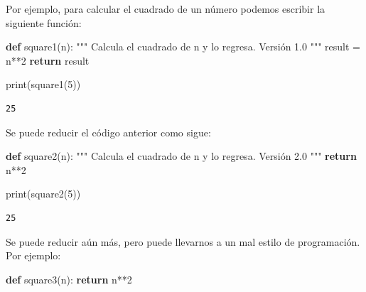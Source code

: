\documentclass[
  spanish,
  letterpaper,
]{scrbook}
\newenvironment{Shaded}{\begin{snugshade}}{\end{snugshade}}
\newcommand{\BuiltInTok}[1]{\textcolor[rgb]{0.00,0.23,0.31}{#1}}
\newcommand{\CommentTok}[1]{\textcolor[rgb]{0.37,0.37,0.37}{#1}}
\newcommand{\ControlFlowTok}[1]{\textcolor[rgb]{0.00,0.23,0.31}{\textbf{#1}}}
\newcommand{\DecValTok}[1]{\textcolor[rgb]{0.68,0.00,0.00}{#1}}
\newcommand{\KeywordTok}[1]{\textcolor[rgb]{0.00,0.23,0.31}{\textbf{#1}}}
\newcommand{\NormalTok}[1]{\textcolor[rgb]{0.00,0.23,0.31}{#1}}
\newcommand{\OperatorTok}[1]{\textcolor[rgb]{0.37,0.37,0.37}{#1}}
\theoremstyle{definition}
\theoremstyle{remark}
\begin{document}
Por ejemplo, para calcular el cuadrado de un número podemos escribir la
siguiente función:

\begin{Shaded}
\begin{Highlighting}[]
\KeywordTok{def}\NormalTok{ square1(n):}
    \CommentTok{"""}
\CommentTok{    Calcula el cuadrado de n y lo regresa. Versión 1.0}
\CommentTok{    """}
\NormalTok{    result }\OperatorTok{=}\NormalTok{ n}\OperatorTok{**}\DecValTok{2}
    \ControlFlowTok{return}\NormalTok{ result}
\end{Highlighting}
\end{Shaded}

\begin{Shaded}
\begin{Highlighting}[]
\BuiltInTok{print}\NormalTok{(square1(}\DecValTok{5}\NormalTok{))}
\end{Highlighting}
\end{Shaded}

\begin{verbatim}
25
\end{verbatim}

Se puede reducir el código anterior como sigue:

\begin{Shaded}
\begin{Highlighting}[]
\KeywordTok{def}\NormalTok{ square2(n):}
    \CommentTok{"""}
\CommentTok{    Calcula el cuadrado de n y lo regresa. Versión 2.0}
\CommentTok{    """}
    \ControlFlowTok{return}\NormalTok{ n}\OperatorTok{**}\DecValTok{2}
\end{Highlighting}
\end{Shaded}

\begin{Shaded}
\begin{Highlighting}[]
\BuiltInTok{print}\NormalTok{(square2(}\DecValTok{5}\NormalTok{))}
\end{Highlighting}
\end{Shaded}

\begin{verbatim}
25
\end{verbatim}

Se puede reducir aún más, pero puede llevarnos a un mal estilo de
programación. Por ejemplo:

\begin{Shaded}
\begin{Highlighting}[]
\KeywordTok{def}\NormalTok{ square3(n): }\ControlFlowTok{return}\NormalTok{ n}\OperatorTok{**}\DecValTok{2}
\end{Highlighting}
\end{Shaded}
\end{document}
